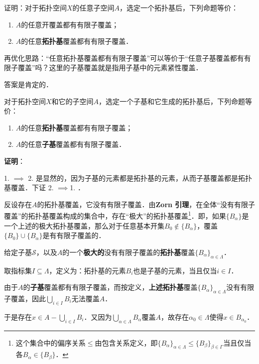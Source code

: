 \begin{exercise}{}
证明：对于拓扑空间$X$的任意子空间$A$，选定一个拓扑基后，下列命题等价：
\begin{enumerate}
\item $A$的任意开覆盖都有有限子覆盖；
\item $A$的任意\textbf{拓扑基}覆盖都有有限子覆盖．
\end{enumerate}
\end{exercise}

再优化思路：“任意拓扑基覆盖都有有限子覆盖”可以等价于“任意子基覆盖都有有限子覆盖”吗？这里的子基覆盖就是指用子基中的元素紧性覆盖．

答案是肯定的．

\begin{theorem}{}
对于拓扑空间$X$和它的子空间$A$，选定一个子基和它生成的拓扑基后，下列命题等价：
\begin{enumerate}
\item $A$的任意\textbf{拓扑基}覆盖都有有限子覆盖；
\item $A$的任意\textbf{子基}覆盖都有有限子覆盖．
\end{enumerate}
\end{theorem}

\textbf{证明}：

1. $\implies$ 2. 是显然的，因为子基的元素都是拓扑基的元素，从而子基覆盖都是拓扑基覆盖．下证 2. $\implies$1. ．

反设存在$A$的拓扑基覆盖，它没有有限子覆盖．由\textbf{Zorn 引理}，在全体“没有有限子覆盖”的拓扑基覆盖构成的集合中，存在“极大”的拓扑基覆盖\footnote{这个集合中的偏序关系$\leq$由包含关系定义，即$\{B_\alpha\}_{\alpha\in \Lambda}\leq\{B_\beta\}_{\beta\in \Gamma}$当且仅当各$B_\alpha\in\{B_\beta\}$．}．即，如果$\{B_\alpha\}$是一个上述的极大拓扑基覆盖，那么对于任意基本开集$B_0\not\in\{B_\alpha\}$，覆盖$\{B_0\}\cup\{B_\alpha\}$是有有限子覆盖的．

给定子基$\mathcal{S}$，以及$A$的一个\textbf{极大的}没有有限子覆盖的\textbf{拓扑基}覆盖$\{B_\alpha\}_{\alpha\in \Lambda}$．

取指标集$I\subseteq \Lambda$，定义为：拓扑基的元素$B_i$也是子基的元素，当且仅当$i\in I$．

由于$A$的\textbf{子基}覆盖都有有限子覆盖，而按定义，\textbf{上述拓扑基}覆盖$\{B_\alpha\}_{\alpha\in \Lambda}$没有有限子覆盖，因此$\bigcup_{i\in I} B_i$无法覆盖$A$．

于是存在$x\in A-\bigcup_{i\in I} B_i$．又因为$\bigcup_{\alpha\in \Lambda}B_\alpha$覆盖$A$，故存在$\alpha_0\in\Lambda$使得$x\in B_{\alpha_0}$．

